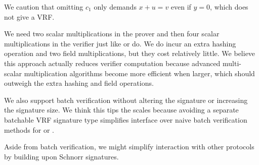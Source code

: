 We caution that omitting $c_1$ only demands $x + u = v$ even if $y=0$,
which does not give a VRF.

We need two scalar multiplications in the prover and
 then four scalar multiplications in the verifier
 just like \cite{nsec5} or \cite{VXEd25519} do.
We do incur an extra hashing operation and two field multiplications,
 but they cost relatively little.
We believe this approach actually reduces verifier computation because
advanced multi-scalar multiplication algorithms become more efficient when
larger, which should outweigh the extra hashing and field operations.

We also support batch verification without altering the signature or
increasing the signature size.  We think this tips the scales because
avoiding a separate batchable VRF signature type simplifies interface
over naive batch verification methods for \cite{nsec5} or \cite{VXEd25519}.

Aside from batch verification, we might simplify interaction with
other protocols by building upon Schnorr signatures.




\endinput



\section{UC}




